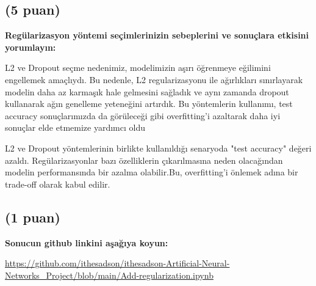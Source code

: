 \documentclass[11pt]{article}
\begin{document}
\subsection{(5 puan)} \textbf{Regülarizasyon yöntemi seçimlerinizin sebeplerini ve sonuçlara etkisini yorumlayın:}

L2 ve Dropout seçme nedenimiz, modelimizin aşırı öğrenmeye eğilimini engellemek amaçlıydı. Bu nedenle, L2 regularizasyonu ile ağırlıkları sınırlayarak modelin daha az karmaşık hale gelmesini sağladık ve aynı zamanda dropout kullanarak ağın genelleme yeteneğini artırdık. Bu yöntemlerin kullanımı, test accuracy sonuçlarımızda da görüleceği gibi overfitting'i azaltarak daha iyi sonuçlar elde etmemize yardımcı oldu

L2 ve Dropout yöntemlerinin birlikte kullanıldığı senaryoda "test accuracy" değeri azaldı.
Regülarizasyonlar bazı özelliklerin çıkarılmasına neden olacağından modelin performansında bir azalma olabilir.Bu, overfitting'i önlemek adına bir trade-off olarak kabul edilir.

\subsection{(1 puan)} \textbf{Sonucun github linkini  aşağıya koyun:}

\url{https://github.com/ithesadson/ithesadson-Artificial-Neural-Networks_Project/blob/main/Add-regularization.ipynb}
\end{document}
